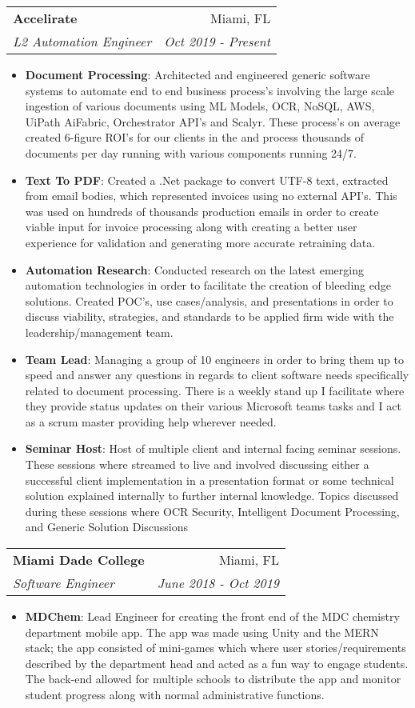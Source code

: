 \documentclass[letterpaper,11pt]{article}
\makeatletter
\newcommand{\resumeItem}[2]{
  \item\small{
    \textbf{#1}{: #2 \vspace{-2pt}}
  }
}
\newcommand{\resumeSubheading}[4]{
  \vspace{-1pt}\item
    \begin{tabular*}{0.97\textwidth}{l@{\extracolsep{\fill}}r}
      \textbf{#1} & #2 \\
      \textit{\small#3} & \textit{\small #4} \\
    \end{tabular*}\vspace{-5pt}
}
\newcommand{\resumeItemListStart}{\begin{itemize}}
\newcommand{\resumeItemListEnd}{\end{itemize}\vspace{-5pt}}
\makeatother
\begin{document}
    \resumeSubheading
      {Accelirate}{Miami, FL}
      {L2 Automation Engineer}{Oct 2019 - Present}
      \resumeItemListStart
        \resumeItem{Document Processing}
          {Architected and engineered generic software systems to automate end to end business process's involving the large scale ingestion of various documents using ML Models, OCR, NoSQL, AWS, UiPath AiFabric, Orchestrator API's and Scalyr. These process's on average created 6-figure ROI's for our clients in the and process thousands of documents per day running with various components running 24/7.}
          \resumeItem{Text To PDF}
          {Created a .Net package to convert UTF-8 text, extracted from email bodies, which represented invoices using no external API's. This was used on hundreds of thousands production emails in order to create viable input for invoice processing along with creating a better user experience for validation and generating more accurate retraining data.}
        \resumeItem{Automation Research}
          {Conducted research on the latest emerging automation technologies in order to facilitate the creation of bleeding edge solutions. Created POC's, use cases/analysis, and presentations in order to discuss viability, strategies, and standards to be applied firm wide with the leadership/management team.}
        \resumeItem{Team Lead}
          {Managing a group of 10 engineers in order to bring them up to speed and answer any questions in regards to client software needs specifically related to document processing. There is a weekly stand up I facilitate where they provide status updates on their various Microsoft teams tasks and I act as a scrum master providing help wherever needed.}
        \resumeItem{Seminar Host}
          {Host of multiple client and internal facing seminar sessions. These sessions where streamed to live and involved discussing either a successful client implementation in a presentation format or some technical solution explained internally to further internal knowledge. Topics discussed during these sessions where OCR Security, Intelligent Document Processing, and Generic Solution Discussions}
      \resumeItemListEnd

    \resumeSubheading
      {Miami Dade College}{Miami, FL}
      {Software Engineer}{June 2018 - Oct 2019}
      \resumeItemListStart
        \resumeItem{MDChem}
          {Lead Engineer for creating the front end of the MDC chemistry department mobile app. The app was made using Unity and the MERN stack; the app consisted of mini-games which where user stories/requirements described by the department head and acted as a fun way to engage students. The back-end allowed for multiple schools to distribute the app and monitor student progress along with normal administrative functions.}
      \resumeItemListEnd
\end{document}

